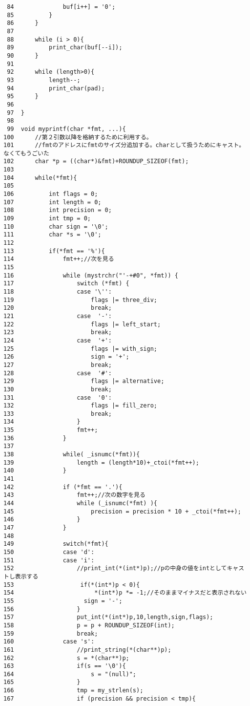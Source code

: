 \documentclass[a4j,11pt]{jarticle}
\begin{document}
\begin{verbatim}
 84              buf[i++] = '0';
 85          }
 86      }
 87
 88      while (i > 0){
 89          print_char(buf[--i]);
 90      }
 91
 92      while (length>0){
 93          length--;
 94          print_char(pad);
 95      }
 96
 97  }
 98
 99  void myprintf(char *fmt, ...){
100      //第２引数以降を格納するために利用する。
101      //fmtのアドレスにfmtのサイズ分追加する。charとして扱うためにキャスト。なくてもうごいた
102      char *p = ((char*)&fmt)+ROUNDUP_SIZEOF(fmt);
103
104      while(*fmt){
105
106          int flags = 0;
107          int length = 0;
108          int precision = 0;
109          int tmp = 0;
110          char sign = '\0';
111          char *s = '\0';
112
113          if(*fmt == '%'){
114              fmt++;//次を見る
115
116              while (mystrchr("'-+#0", *fmt)) {
117                  switch (*fmt) {
118                  case '\'':
119                      flags |= three_div;
120                      break;
121                  case  '-':
122                      flags |= left_start;
123                      break;
124                  case  '+':
125                      flags |= with_sign;
126                      sign = '+';
127                      break;
128                  case  '#':
129                      flags |= alternative;
130                      break;
131                  case  '0':
132                      flags |= fill_zero;
133                      break;
134                  }
135                  fmt++;
136              }
137
138              while( _isnumc(*fmt)){
139                  length = (length*10)+_ctoi(*fmt++);
140              }
141
142              if (*fmt == '.'){
143                  fmt++;//次の数字を見る
144                  while (_isnumc(*fmt) ){
145                      precision = precision * 10 + _ctoi(*fmt++);
146                  }
147              }
148
149              switch(*fmt){
150              case 'd':
151              case 'i':
152                  //print_int(*(int*)p);//pの中身の値をintとしてキャストし表示する
153                   if(*(int*)p < 0){
154                       *(int*)p *= -1;//そのままマイナスだと表示されない
155                    sign = '-';
156                  }
157                  put_int(*(int*)p,10,length,sign,flags);
158                  p = p + ROUNDUP_SIZEOF(int);
159                  break;
160              case 's':
161                  //print_string(*(char**)p);
162                  s = *(char**)p;
163                  if(s == '\0'){
164                      s = "(null)";
165                  }
166                  tmp = my_strlen(s);
167                  if (precision && precision < tmp){

\end{verbatim}
\end{document}
